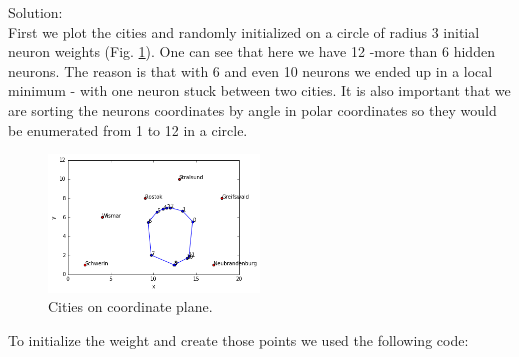 \documentclass[a4paper, 12pt]{article}
\begin{document}
Solution:\\

First we plot the cities and randomly initialized on a circle of radius 3 initial neuron weights (Fig. \ref{citiesCoord}). One can see that here we have 12 -more than 6 hidden neurons. The reason is that with 6 and even 10 neurons we ended up in a local minimum - with one neuron stuck between two cities. It is also important that we are sorting the neurons coordinates by angle in polar coordinates so they would be enumerated from 1 to 12 in a circle.

\begin{figure}[h]
  \centering
  \caption{Cities on coordinate plane.\label{citiesCoord}}
  \includegraphics[width=0.5\textwidth]{cities_plotted}
\end{figure}

To initialize the weight and create those points we used the following code:
\end{document}
